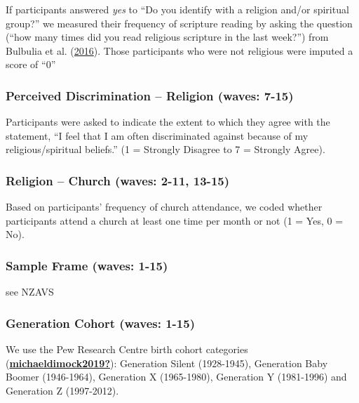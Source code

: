 \documentclass[
  singlecolumn]{report}
\begin{document}
If participants answered \emph{yes} to ``Do you identify with a religion
and/or spiritual group?'' we measured their frequency of scripture
reading by asking the question (``how many times did you read religious
scripture in the last week?'') from Bulbulia et al.
(\protect\hyperlink{ref-bulbulia2016}{2016}). Those participants who
were not religious were imputed a score of ``0''

\hypertarget{perceived-discrimination-religion-waves-7-15}{%
\subsubsection{Perceived Discrimination -- Religion (waves:
7-15)}\label{perceived-discrimination-religion-waves-7-15}}

Participants were asked to indicate the extent to which they agree with
the statement, ``I feel that I am often discriminated against because of
my religious/spiritual beliefs.'' (1 = Strongly Disagree to 7 = Strongly
Agree).

\hypertarget{religion-church-waves-2-11-13-15}{%
\subsubsection{Religion -- Church (waves: 2-11,
13-15)}\label{religion-church-waves-2-11-13-15}}

Based on participants' frequency of church attendance, we coded whether
participants attend a church at least one time per month or not (1 =
Yes, 0 = No).

\hypertarget{sample-frame-waves-1-15}{%
\subsubsection{Sample Frame (waves:
1-15)}\label{sample-frame-waves-1-15}}

see NZAVS

\hypertarget{generation-cohort-waves-1-15}{%
\subsubsection{Generation Cohort (waves:
1-15)}\label{generation-cohort-waves-1-15}}

We use the Pew Research Centre birth cohort categories
(\protect\hyperlink{ref-michaeldimock2019}{\textbf{michaeldimock2019?}}):
Generation Silent (1928-1945), Generation Baby Boomer (1946-1964),
Generation X (1965-1980), Generation Y (1981-1996) and Generation Z
(1997-2012).
\end{document}
